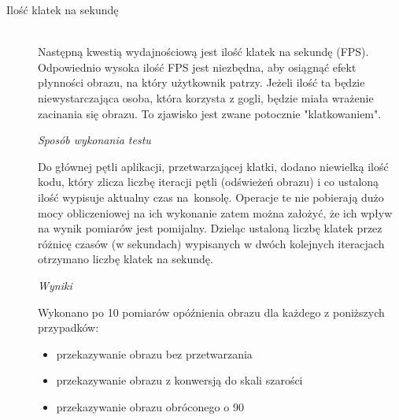 \documentclass[a4paper,11pt,twoside]{report}
\theoremstyle{definition}
\begin{document}
\begin{description}
\item[Ilość klatek na sekundę] \hfill \\
Następną kwestią wydajnościową jest ilość klatek na sekundę (FPS). Odpowiednio wysoka ilość FPS jest niezbędna, aby osiągnąć efekt płynności obrazu, na który użytkownik patrzy. Jeżeli ilość ta będzie niewystarczająca osoba, która korzysta z gogli, będzie miała wrażenie zacinania się obrazu. To zjawisko jest zwane potocznie "klatkowaniem".

\textit{Sposób wykonania testu}

Do głównej pętli aplikacji, przetwarzającej klatki, dodano niewielką ilość kodu, który zlicza liczbę iteracji pętli (odświeżeń obrazu) i co ustaloną ilość wypisuje aktualny czas na~konsolę. Operacje te nie pobierają dużo mocy obliczeniowej na ich wykonanie zatem można założyć, że ich wpływ na wynik pomiarów jest pomijalny. Dzieląc ustaloną liczbę klatek przez różnicę czasów (w sekundach) wypisanych w dwóch kolejnych iteracjach otrzymano liczbę klatek na sekundę.

\textit{Wyniki}

Wykonano po 10 pomiarów opóźnienia obrazu dla każdego z poniższych przypadków:
\begin{itemize}
\item przekazywanie obrazu bez przetwarzania
\item przekazywanie obrazu z konwersją do skali szarości
\item przekazywanie obrazu obróconego o 90\textdegree
\end{itemize}


\end{description}
\end{document}

